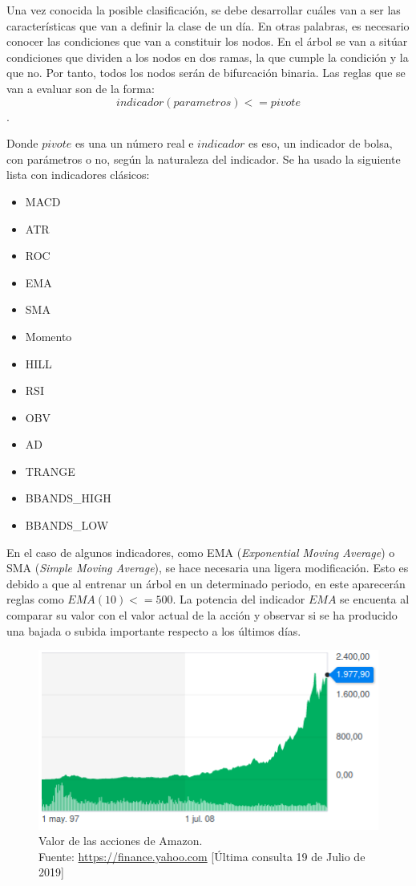 Una vez conocida la posible clasificaci\'on, se debe desarrollar cu\'ales van a ser las caracter\'isticas que van a definir la clase de un d\'ia. En otras palabras, es necesario conocer las condiciones que van a constituir los nodos. En el \'arbol se van a sit\'uar condiciones que dividen a los nodos en dos ramas, la que cumple la condici\'on y la que no. Por tanto, todos los nodos ser\'an de bifurcaci\'on binaria. Las reglas que se van a evaluar son de la forma: 
 \[indicador(parametros) <= pivote\].
 
 Donde $pivote$ es una un n\'umero real e $indicador$ es eso, un indicador de bolsa, con par\'ametros o no, seg\'un la naturaleza del indicador. Se ha usado la siguiente lista con indicadores cl\'asicos:
 
 \begin{itemize}
     \item MACD
     \item ATR
     \item ROC
     \item EMA
     \item SMA
     \item Momento
     \item HILL
     \item RSI
     \item OBV
     \item AD
     \item TRANGE
     \item BBANDS\_HIGH
     \item BBANDS\_LOW
 \end{itemize}
 
 En el caso de algunos indicadores, como EMA (\textit{Exponential Moving Average}) o SMA (\textit{Simple Moving Average}), se hace necesaria una ligera modificaci\'on. Esto es debido a que al entrenar un \'arbol en un determinado periodo, en este aparecer\'an reglas como $EMA(10) <= 500$. La potencia del indicador $EMA$ se encuenta al comparar su valor con el valor actual de la acci\'on y observar si se ha producido una bajada o subida importante respecto a los \'ultimos d\'ias.  

 
 		\begin{figure}[H]
    		\centering
    		\includegraphics[scale=0.7]{imagenes/amazon.png}
    	    \caption[Valor de las acciones de Amazon en un periodo concreto]{Valor de las acciones de Amazon.\\ Fuente: \url{https://finance.yahoo.com} [\'Ultima consulta 19 de Julio de 2019]}
    		\label{fig:amazon}
	   \end{figure}
	   
